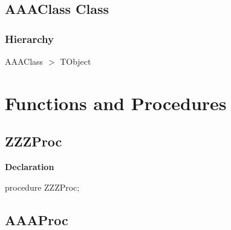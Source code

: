 \documentclass{report}
\newif\ifpdf
\begin{document}
\subsection*{AAAClass Class}
\fi
\label{ok_sorting.AAAClass}
\subsubsection*{\large{\textbf{Hierarchy}}\normalsize\hspace{1ex}\hfill}
AAAClass {$>$} TObject
\section{Functions and Procedures}
\ifpdf
\subsection*{\large{\textbf{ZZZProc}}\normalsize\hspace{1ex}\hrulefill}
\else
\subsection*{ZZZProc}
\fi
\label{ok_sorting-ZZZProc}
\begin{list}{}{
\setlength{\itemindent}{0cm}
\setlength{\listparindent}{0cm}
\setlength{\leftmargin}{\evensidemargin}
\addtolength{\leftmargin}{\tmplength}
\settowidth{\labelsep}{X}
\addtolength{\leftmargin}{\labelsep}
\setlength{\labelwidth}{\tmplength}
}
\item[\textbf{Declaration}\hfill]
\ifpdf
\begin{flushleft}
\fi
\begin{ttfamily}
procedure ZZZProc;\end{ttfamily}

\ifpdf
\end{flushleft}
\fi

\end{list}
\ifpdf
\subsection*{\large{\textbf{AAAProc}}\normalsize\hspace{1ex}\hrulefill}
\else
\end{document}
